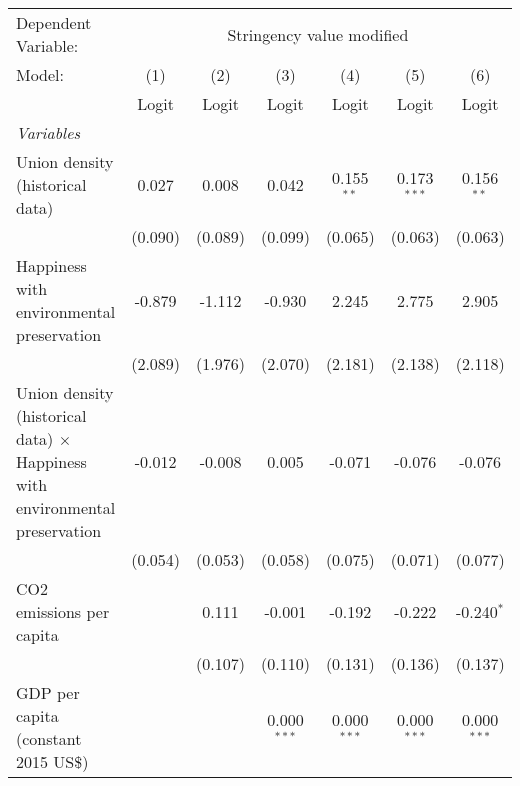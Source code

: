 
\begingroup
\centering
\begin{tabular}{lcccccc}
   \toprule
   Dependent Variable: & \multicolumn{6}{c}{Stringency value modified}\\
   Model:                                                                              & (1)     & (2)     & (3)           & (4)           & (5)           & (6)\\  
                                                                                       &  Logit  & Logit   & Logit         & Logit         & Logit         & Logit\\  
   \midrule
   \emph{Variables}\\
   Union density (historical data)                                                     & 0.027   & 0.008   & 0.042         & 0.155$^{**}$  & 0.173$^{***}$ & 0.156$^{**}$\\   
                                                                                       & (0.090) & (0.089) & (0.099)       & (0.065)       & (0.063)       & (0.063)\\   
   Happiness with environmental preservation                                           & -0.879  & -1.112  & -0.930        & 2.245         & 2.775         & 2.905\\   
                                                                                       & (2.089) & (1.976) & (2.070)       & (2.181)       & (2.138)       & (2.118)\\   
   Union density (historical data) $\times$ Happiness with environmental preservation  & -0.012  & -0.008  & 0.005         & -0.071        & -0.076        & -0.076\\   
                                                                                       & (0.054) & (0.053) & (0.058)       & (0.075)       & (0.071)       & (0.077)\\   
   CO2 emissions per capita                                                            &         & 0.111   & -0.001        & -0.192        & -0.222        & -0.240$^{*}$\\   
                                                                                       &         & (0.107) & (0.110)       & (0.131)       & (0.136)       & (0.137)\\   
   GDP per capita (constant 2015 US\$)                                                 &         &         & 0.000$^{***}$ & 0.000$^{***}$ & 0.000$^{***}$ & 0.000$^{***}$\\   

\end{tabular}
